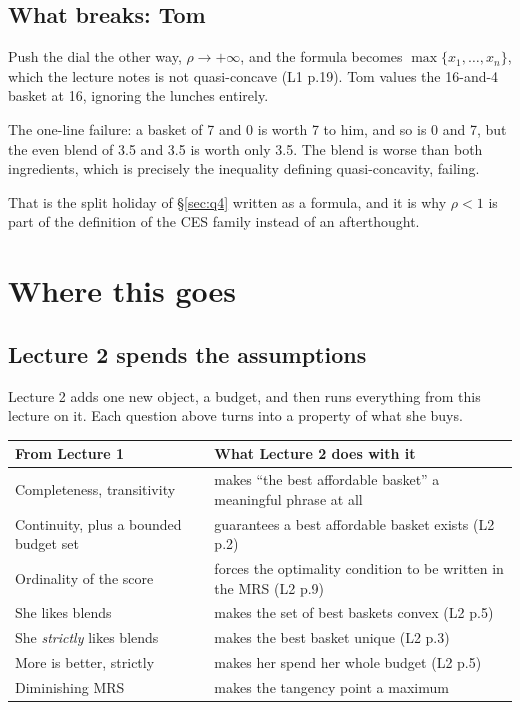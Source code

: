 \documentclass[11pt,letterpaper]{article}
\theoremstyle{definition}
\theoremstyle{plain}
\newcommand{\src}[1]{{\small\textsf{(#1)}}}
\begin{document}
\subsection{What breaks: Tom}

Push the dial the other way, $\rho \to +\infty$, and the formula becomes
$\max\{x_1, \dots, x_n\}$, which the lecture notes is not quasi-concave \src{L1 p.19}. Tom values the
16-and-4 basket at 16, ignoring the lunches entirely.

The one-line failure: a basket of 7 and 0 is worth 7 to him, and so is 0 and 7, but the even blend of
3.5 and 3.5 is worth only 3.5. The blend is worse than both ingredients, which is precisely the
inequality defining quasi-concavity, failing.

That is the split holiday of \S\ref{sec:q4} written as a formula, and it is why $\rho < 1$ is part of
the definition of the CES family instead of an afterthought.

\section{Where this goes}

\subsection{Lecture 2 spends the assumptions}

Lecture 2 adds one new object, a budget, and then runs everything from this lecture on it. Each
question above turns into a property of what she buys.

\begin{center}
\begin{tabular}{@{}p{} p{}@{}}
\toprule
\textbf{From Lecture 1} & \textbf{What Lecture 2 does with it} \\
\midrule
Completeness, transitivity & makes ``the best affordable basket'' a meaningful phrase at all \\
Continuity, plus a bounded budget set & guarantees a best affordable basket exists \src{L2 p.2} \\
Ordinality of the score & forces the optimality condition to be written in the MRS \src{L2 p.9} \\
She likes blends & makes the set of best baskets convex \src{L2 p.5} \\
She \emph{strictly} likes blends & makes the best basket unique \src{L2 p.3} \\
More is better, strictly & makes her spend her whole budget \src{L2 p.5} \\
Diminishing MRS & makes the tangency point a maximum \\
\bottomrule
\end{tabular}
\end{center}
\end{document}
